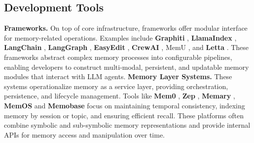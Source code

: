 \documentclass[manuscript,screen]{acmart}
\begin{document}
\begin{table}[t]
\begin{tabular}

\bottomrule
\end{tabular}
\label{tab:tools_comparison}
\end{table}

\subsection{Development Tools}
\label{sec:tools}

\textbf{Frameworks.} On top of core infrastructure, frameworks offer modular interface for memory-related operations. Examples include \textbf{Graphiti} \citep{he2025graphiti}, \textbf{LlamaIndex} \citep{llamaindex}, \textbf{LangChain} \citep{langchain}, \textbf{LangGraph} \citep{langgraph2025}, \textbf{EasyEdit} \citep{wang-etal-2024-easyedit}, \textbf{CrewAI} \citep{duan2024exploration}, MemU \citep{NevaMindAI2025memU}, and \textbf{Letta} \citep{packer2023memgpt}. These frameworks abstract complex memory processes into configurable pipelines, enabling developers to construct multi-modal, persistent, and updatable memory modules that interact with LLM agents. \textbf{Memory Layer Systems.} These systems operationalize memory as a service layer, providing orchestration, persistence, and lifecycle management. Tools like \textbf{Mem0} \citep{mem0}, \textbf{Zep} \citep{rasmussen2025zep}, \textbf{Memary} \citep{memary2025}, \textbf{MemOS} \citep{li2025memos} and \textbf{Memobase} \citep{memary2025} focus on maintaining temporal consistency, indexing memory by session or topic, and ensuring efficient recall. These platforms often combine symbolic and sub-symbolic memory representations and provide internal APIs for memory access and manipulation over time.

\end{document}

